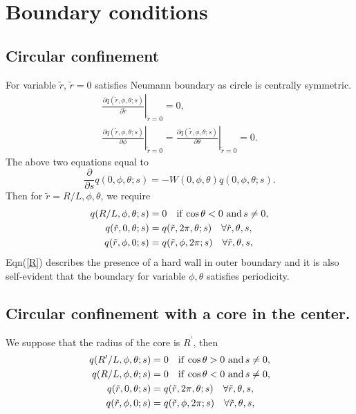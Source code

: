 \documentclass[prl,twocolumn,preprintnumbers,reprint]{revtex4}
\begin{document}
\section{Boundary conditions}

\subsection{Circular confinement}
For variable $\tilde{r}$, $\tilde{r}=0$ satisfies Neumann boundary as circle is centrally symmetric.
\begin{align}
\left.\frac{\partial q(\tilde{r},\phi,\theta;s)}{\partial \tilde{r}}\right|_{\tilde{r}=0}=0,\qquad\qquad\\
\left.\frac{\partial q(\tilde{r},\phi,\theta;s)}{\partial \phi}\right|_{\tilde{r}=0}=\left.\frac{\partial q(\tilde{r},\phi,\theta;s)}{\partial \theta}\right|_{\tilde{r}=0}=0.
\end{align}
The above two equations equal to
\begin{equation}
\frac{\partial}{\partial s}q(0,\phi,\theta;s)=-W(0,\phi,\theta)q(0,\phi,\theta;s).
\end{equation}
Then for $\tilde{r}=R/L,\phi,\theta$, we require
\begin{align}
q(R/L,\phi,\theta;s)&=0\quad {\rm if}\,\cos\theta<0\,\,{\rm and}\,s\neq0,\label{R}\\
q(\tilde{r},0,\theta;s)&=q(\tilde{r},2\pi,\theta;s)\quad \forall \tilde{r},\theta,s,\\
q(\tilde{r},\phi,0;s)&=q(\tilde{r},\phi,2\pi;s)\quad \forall \tilde{r},\theta,s,
\end{align}
Eqn(\ref{R}) describes the presence of a hard wall in outer boundary and it is also self-evident that the boundary for variable $\phi,\theta$ satisfies periodicity.
\subsection{Circular confinement with a core in the center.}
We suppose that the radius of the core is $R^\prime$, then
\begin{align}
q(R^\prime/L,\phi,\theta;s)&=0\quad {\rm if}\,\cos\theta>0\,\,{\rm and}\,s\neq0,\label{R}\\
q(R/L,\phi,\theta;s)&=0\quad {\rm if}\,\cos\theta<0\,\,{\rm and}\,s\neq0,\label{R}\\
q(\tilde{r},0,\theta;s)&=q(\tilde{r},2\pi,\theta;s)\quad \forall \tilde{r},\theta,s,\\
q(\tilde{r},\phi,0;s)&=q(\tilde{r},\phi,2\pi;s)\quad \forall \tilde{r},\theta,s,
\end{align}
\end{document}
